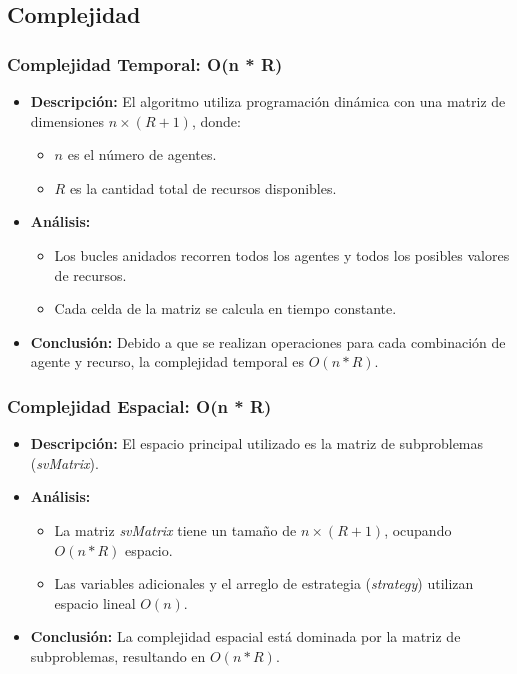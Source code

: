 \documentclass[letterpaper,10pt]{article}
\begin{document}
\subsection{Complejidad}
\subsubsection{Complejidad Temporal: O(n * R)}
\begin{itemize}
    \item \textbf{Descripción:} El algoritmo utiliza programación dinámica con una matriz de dimensiones \(n \times (R + 1)\), donde:
    \begin{itemize}
        \item \(n\) es el número de agentes.
        \item \(R\) es la cantidad total de recursos disponibles.
    \end{itemize}
    
    \item \textbf{Análisis:}
    \begin{itemize}
        \item Los bucles anidados recorren todos los agentes y todos los posibles valores de recursos.
        \item Cada celda de la matriz se calcula en tiempo constante.
    \end{itemize}
    
    \item \textbf{Conclusión:} Debido a que se realizan operaciones para cada combinación de agente y recurso, la complejidad temporal es \(O(n * R)\).
\end{itemize}

\subsubsection{Complejidad Espacial: O(n * R)}
\begin{itemize}
    \item \textbf{Descripción:} El espacio principal utilizado es la matriz de subproblemas (\textit{svMatrix}).
    
    \item \textbf{Análisis:}
    \begin{itemize}
        \item La matriz \textit{svMatrix} tiene un tamaño de \(n \times (R + 1)\), ocupando \(O(n * R)\) espacio.
        \item Las variables adicionales y el arreglo de estrategia (\textit{strategy}) utilizan espacio lineal \(O(n)\).
    \end{itemize}
    
    \item \textbf{Conclusión:} La complejidad espacial está dominada por la matriz de subproblemas, resultando en \(O(n * R)\).
\end{itemize}
\label{subsec:complejidad_programacion_dinamica}
\end{document}
